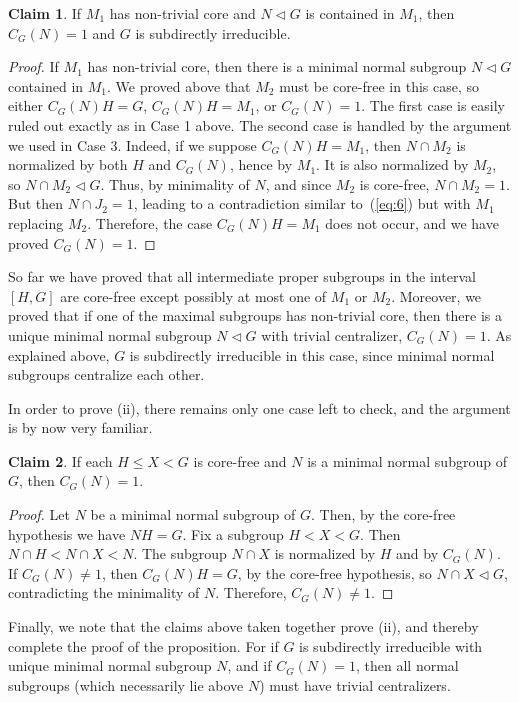 \documentclass[11pt]{amsart}
\theoremstyle{plain}
\theoremstyle{definition}
\newcounter{claim}
\newtheorem{claim}[claim]{Claim}
\theoremstyle{remark}
\numberwithin{theorem}{section}
\numberwithin{claim}{section}
\numberwithin{equation}{section}
\numberwithin{conjecture}{section}
\newcommand{\<}{\ensuremath{\langle}}
\renewcommand{\>}{\ensuremath{\rangle}}
\renewcommand{\leq}{\ensuremath{\leqslant}}
\newcommand{\ssubnormal}{\ensuremath{\vartriangleleft}}
\newcommand{\0}{\ensuremath{\mathbf{0}}}
\newcommand{\1}{\ensuremath{\mathbf{1}}}
\newcommand{\2}{\ensuremath{\mathbf{2}}}
\newcommand{\3}{\ensuremath{\mathbf{3}}}
\newcommand{\4}{\ensuremath{\mathbf{4}}}
\newcommand{\5}{\ensuremath{\mathbf{5}}}
\begin{document}
\begin{claim}
If $M_1$ has non-trivial core
  and $N\ssubnormal G$ is contained in $M_1$, then
  $C_G(N)=1$ and $G$ is subdirectly irreducible.
\end{claim}
\begin{proof}
If $M_1$ has non-trivial core, then there is a minimal normal
subgroup $N\ssubnormal G$ contained in $M_1$.  We proved above that
$M_2$ must be core-free in this case, so either $C_G(N)H  = G$, 
$C_G(N)H  = M_1$, 
or $C_G(N)=1$.  The first case is easily ruled out exactly as in Case 1 above. 
The second case is handled by the argument we used in Case 3.  Indeed, if we suppose 
$C_G(N)H = M_1$, 
then 
$N\cap M_2$ 
is normalized by both $H$ and $C_G(N)$, hence by
$M_1$.  It is also normalized by $M_2$, so 
$N\cap M_2\ssubnormal G$.  Thus, by minimality of $N$, 
and since $M_2$ is core-free,
$N\cap M_2 = 1$.  But then $N\cap J_2 = 1$,
leading to a contradiction similar to~(\ref{eq:6}) but with $M_1$ replacing $M_2$.  
Therefore, the case 
$C_G(N)H = M_1$ does not occur, and we have proved $C_G(N)=1$. 
\end{proof}


So far we have proved that all intermediate proper subgroups in the interval $[H, G]$
are core-free except possibly at most one of $M_1$ or $M_2$.  Moreover, we
proved that if one of the maximal subgroups has non-trivial core, then there is
a unique minimal normal subgroup $N\ssubnormal G$ with trivial centralizer,
$C_G(N) = 1$.  As explained above, $G$ is subdirectly irreducible in this case,
since minimal normal subgroups centralize each other.

In order to prove (ii), there remains only one case left to check, and the
argument is by now very familiar.
\begin{claim}
  If each $H\leq X < G$ is core-free and $N$ is a minimal normal subgroup of
  $G$, then $C_G(N) = 1$.
\end{claim}
\begin{proof}
  Let $N$ be a minimal normal subgroup of $G$. Then, by the core-free hypothesis
  we have $NH = G$. Fix a subgroup $H< X < G$.  Then $N\cap H < N\cap X < N$.
  The subgroup $N\cap X$ is normalized by $H$ and by 
  $C_G(N)$.  If $C_G(N) \neq 1$, then $C_G(N)H = G$, by the core-free
  hypothesis, so $N\cap X\ssubnormal G$, contradicting the minimality of $N$.  
  Therefore, $C_G(N) \neq 1$.
\end{proof}
Finally, we note that the claims above taken together prove (ii), and thereby
complete the proof of the proposition.  For if $G$ is subdirectly irreducible with
unique minimal normal subgroup $N$, and if $C_G(N) = 1$, then all normal
subgroups (which necessarily lie above $N$) must have trivial centralizers. 
\end{document}
